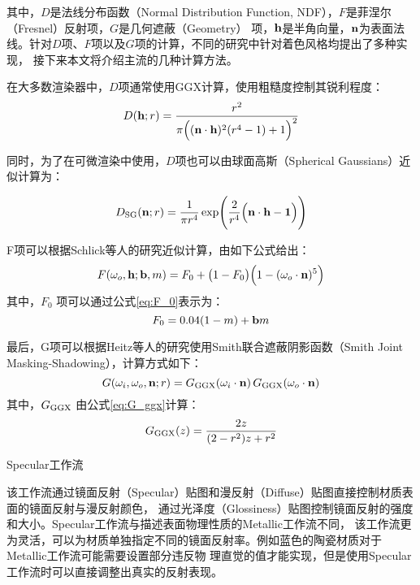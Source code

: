 其中，$D$是法线分布函数（Normal Distribution Function, NDF），$F$是菲涅尔（Fresnel）反射项，$G$是几何遮蔽（Geometry）
项，$\bf{h}$是半角向量，$\bf{n}$为表面法线。针对$D$项、$F$项以及$G$项的计算，不同的研究中针对着色风格均提出了多种实现，
接下来本文将介绍主流的几种计算方法。

在大多数渲染器中，$D$项通常使用GGX\cite{walter2007microfacet}计算，使用粗糙度控制其锐利程度：
\begin{equation}\label{eq:D_ggx}
D({\bf{h}};r)=\frac{r^2}{\pi\Bigl(({\bf{n}}\cdot{\bf{h}})^2(r^4-1)+1\Bigr)^2}
\end{equation}

同时，为了在可微渲染中使用，$D$项也可以由球面高斯（Spherical Gaussians）近似计算为：

\begin{equation}\label{eq:Dsg}
D_{\rm{SG}}({\bf{n}};r)=\frac{1}{\pi r^4}\exp\Biggl(\frac{2}{r^4}\Bigl({\bf{n}}\cdot{\bf{h}}-\mathbf{1}\Bigr)\Biggr)
\end{equation}

F项可以根据Schlick等人\cite{schlick1994inexpensive}的研究近似计算，由如下公式给出：
\begin{equation}
  \label{eq:F}
  F(\omega_o,{\bf{h}};{\bf{b}},m)=F_0+\bigl(1-F_0\bigr)\Bigl(1-(\omega_o\cdot{\bf{n}})^5\Bigr)
\end{equation}
其中，$F_0$ 项可以通过公式\eqref{eq:F_0}表示为：
\begin{equation}
  \label{eq:F_0}
  F_0=0.04(1-m)+{\bf{b}}m
\end{equation}

最后，G项可以根据Heitz等人\cite{heitz2014understanding}的研究使用Smith联合遮蔽阴影函数（Smith Joint Masking-Shadowing），计算方式如下：
\begin{equation}
  \label{eq:G}
  G(\omega_i,\omega_o,{\bf{n}};r)=G_{\rm{GGX}}(\omega_i\cdot{\bf{n}})\,G_{\rm{GGX}}(\omega_o\cdot{\bf{n}})
\end{equation}
其中，$G_{\rm{GGX}}$ 由公式\eqref{eq:G_ggx}计算：
\begin{equation}
  \label{eq:G_ggx}
  G_{\rm{GGX}}(z)=\frac{2z}{(2-r^2)z+r^2}
\end{equation}

 Specular工作流

该工作流通过镜面反射（Specular）贴图和漫反射（Diffuse）贴图直接控制材质表面的镜面反射与漫反射颜色，
通过光泽度（Glossiness）贴图控制镜面反射的强度和大小。Specular工作流与描述表面物理性质的Metallic工作流不同，
该工作流更为灵活，可以为材质单独指定不同的镜面反射率。例如蓝色的陶瓷材质对于Metallic工作流可能需要设置部分违反物
理直觉的值才能实现，但是使用Specular工作流时可以直接调整出真实的反射表现。

